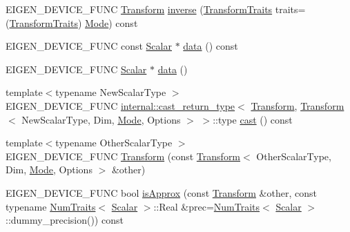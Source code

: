 \begin{DoxyCompactItemize}
\item 
E\+I\+G\+E\+N\+\_\+\+D\+E\+V\+I\+C\+E\+\_\+\+F\+U\+NC \mbox{\hyperlink{class_eigen_1_1_transform}{Transform}} \mbox{\hyperlink{class_eigen_1_1_transform_a20ca137b84f18b9c41a0fef9c222e0da}{inverse}} (\mbox{\hyperlink{group__enums_gaee59a86102f150923b0cac6d4ff05107}{Transform\+Traits}} traits=(\mbox{\hyperlink{group__enums_gaee59a86102f150923b0cac6d4ff05107}{Transform\+Traits}}) \mbox{\hyperlink{struct_mode}{Mode}}) const
\item 
E\+I\+G\+E\+N\+\_\+\+D\+E\+V\+I\+C\+E\+\_\+\+F\+U\+NC const \mbox{\hyperlink{class_eigen_1_1_transform_a4e69ced9d651745b8ed4eda46f41795d}{Scalar}} $\ast$ \mbox{\hyperlink{class_eigen_1_1_transform_a75c33d8e3769936887149c9fca3e709f}{data}} () const
\item 
E\+I\+G\+E\+N\+\_\+\+D\+E\+V\+I\+C\+E\+\_\+\+F\+U\+NC \mbox{\hyperlink{class_eigen_1_1_transform_a4e69ced9d651745b8ed4eda46f41795d}{Scalar}} $\ast$ \mbox{\hyperlink{class_eigen_1_1_transform_a57a9ca46062164c4f14342e561e595b9}{data}} ()
\item 
{\footnotesize template$<$typename New\+Scalar\+Type $>$ }\\E\+I\+G\+E\+N\+\_\+\+D\+E\+V\+I\+C\+E\+\_\+\+F\+U\+NC \mbox{\hyperlink{struct_eigen_1_1internal_1_1cast__return__type}{internal\+::cast\+\_\+return\+\_\+type}}$<$ \mbox{\hyperlink{class_eigen_1_1_transform}{Transform}}, \mbox{\hyperlink{class_eigen_1_1_transform}{Transform}}$<$ New\+Scalar\+Type, Dim, \mbox{\hyperlink{struct_mode}{Mode}}, Options $>$ $>$\+::type \mbox{\hyperlink{class_eigen_1_1_transform_a4cf2dbae6e95d9efbaae83ab3308ef61}{cast}} () const
\item 
{\footnotesize template$<$typename Other\+Scalar\+Type $>$ }\\E\+I\+G\+E\+N\+\_\+\+D\+E\+V\+I\+C\+E\+\_\+\+F\+U\+NC \mbox{\hyperlink{class_eigen_1_1_transform_a2a6f70385c79d72564e9b309f636ce1d}{Transform}} (const \mbox{\hyperlink{class_eigen_1_1_transform}{Transform}}$<$ Other\+Scalar\+Type, Dim, \mbox{\hyperlink{struct_mode}{Mode}}, Options $>$ \&other)
\item 
E\+I\+G\+E\+N\+\_\+\+D\+E\+V\+I\+C\+E\+\_\+\+F\+U\+NC bool \mbox{\hyperlink{class_eigen_1_1_transform_aa8aabb371eb391a0d1fa0134b34ae376}{is\+Approx}} (const \mbox{\hyperlink{class_eigen_1_1_transform}{Transform}} \&other, const typename \mbox{\hyperlink{struct_eigen_1_1_num_traits}{Num\+Traits}}$<$ \mbox{\hyperlink{class_eigen_1_1_transform_a4e69ced9d651745b8ed4eda46f41795d}{Scalar}} $>$\+::Real \&prec=\mbox{\hyperlink{struct_eigen_1_1_num_traits}{Num\+Traits}}$<$ \mbox{\hyperlink{class_eigen_1_1_transform_a4e69ced9d651745b8ed4eda46f41795d}{Scalar}} $>$\+::dummy\+\_\+precision()) const

\end{DoxyCompactItemize}
